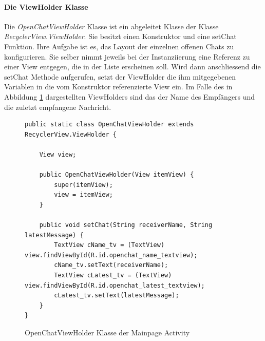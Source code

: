 \documentclass[a4paper,11pt]{report}
\begin{document}
			\paragraph{Die ViewHolder Klasse}
			Die \emph{OpenChatViewHolder} Klasse ist ein abgeleitet Klasse der Klasse \emph{RecyclerView.ViewHolder}. Sie besitzt einen Konstruktor und eine setChat Funktion. Ihre Aufgabe ist es, das Layout der einzelnen offenen Chats zu konfigurieren. Sie selber nimmt jeweils bei der Instanziierung eine Referenz zu einer View entgegen, die in der Liste erscheinen soll. Wird dann anschliessend die setChat Methode aufgerufen, setzt der ViewHolder die ihm mitgegebenen Variablen in die vom Konstruktor referenzierte View ein. Im Falle des in Abbildung \ref{java:viewholder} dargestellten ViewHolders sind das der Name des Empfängers und die zuletzt empfangene Nachricht.
\begin{figure}
	\begin{center}
		\begin{verbatim}
public static class OpenChatViewHolder extends RecyclerView.ViewHolder {
		
	View view;
		
	public OpenChatViewHolder(View itemView) {
		super(itemView);
		view = itemView;
	}
		
	public void setChat(String receiverName, String latestMessage) {
		TextView cName_tv = (TextView) view.findViewById(R.id.openchat_name_textview);
		cName_tv.setText(receiverName);
		TextView cLatest_tv = (TextView) view.findViewById(R.id.openchat_latest_textview);
		cLatest_tv.setText(latestMessage);
	}
}
		\end{verbatim}
		\caption{OpenChatViewHolder Klasse der Mainpage Activity}\label{java:viewholder}
	\end{center}
\end{figure}			
			
\end{document}
